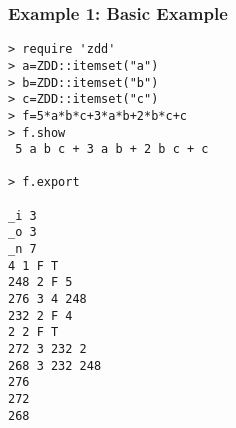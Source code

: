 \subsubsection*{Example 1: Basic Example}



\begin{Verbatim}[baselinestretch=0.7,frame=single]
> require 'zdd'
> a=ZDD::itemset("a")
> b=ZDD::itemset("b")
> c=ZDD::itemset("c")
> f=5*a*b*c+3*a*b+2*b*c+c
> f.show
 5 a b c + 3 a b + 2 b c + c

> f.export

_i 3
_o 3
_n 7
4 1 F T
248 2 F 5
276 3 4 248
232 2 F 4
2 2 F T
272 3 232 2
268 3 232 248
276
272
268
\end{Verbatim}
